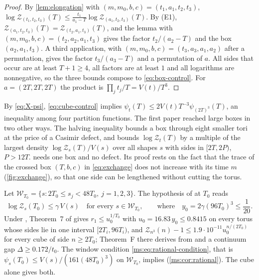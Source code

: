 \documentclass[11pt,a4paper]{amsart}
\theoremstyle{definition}
\theoremstyle{remark}
\numberwithin{equation}{section}
\newcommand{\Wwin}{\mathcal{W}}      %
\newcommand{\TT}{\mathbb{T}}               %
\newcommand{\Zc}{\mathcal{Z}}              %
\newcommand{\Zs}[2]{\Zc_{#1}(#2)}          %
\newcommand{\psiT}[2]{\psi_{#1}(#2)}       %
\newcommand{\Vol}[1]{V(#1)}                %
\newcommand{\cube}[1]{(2#1)^3}             %
\newcommand{\Bstar}{\text{\upshape(B$^{*}$)}}       %
\newcommand{\hypW}{\text{\upshape(W)}}              %
\newcommand{\tzero}{t_0}                   %
\begin{document}
\begin{proof}
By \cref{lem:elongation} with $(m,m_0,b,c)=(t_1,a_1,t_2,t_3)$, $\log\Zs{(t_1,t_2,t_3)}{T}\le\frac{t_1}{a_1-T}\log\Zs{(a_1,t_2,t_3)}{T}$. By (E1), $\Zs{(a_1,t_2,t_3)}{T}=\Zs{(t_2,a_1,t_3)}{T}$, and the lemma with $(m,m_0,b,c)=(t_2,a_2,a_1,t_3)$ gives the factor $t_2/(a_2-T)$ and the box $(a_2,a_1,t_3)$. A third application, with $(m,m_0,b,c)=(t_3,a_3,a_1,a_2)$ after a permutation, gives the factor $t_3/(a_3-T)$ and a permutation of $a$. All sides that occur are at least $T+1\ge4$, all factors are at least $1$ and all logarithms are nonnegative, so the three bounds compose to \eqref{eq:box-control}. For $a=(2T,2T,2T)$ the product is $\prod_jt_j/T=\Vol{t}/T^3$.
\end{proof}

By \eqref{eq:X-psi}, \eqref{eq:cube-control} implies $\psiT{t}{T}\le2\Vol{t}T^{-3}\psiT{\cube{T}}{T}$, an inequality among four partition functions. The first paper reached large boxes in two other ways. The halving inequality \cite[Proposition~13]{bhattacharjee2026first} bounds a box through eight smaller tori at the price of a Casimir defect, and \cite[Proposition~26]{bhattacharjee2026first} bounds $\log\Zs{t}{T}$ by a multiple of the largest density $\log\Zs{s}{T}/\Vol{s}$ over all shapes $s$ with sides in $[2T,2P)$, $P>12T$.  needs one box and no defect. Its proof rests on the fact that the trace of the crossed box $(T,b,c)$ in \eqref{eq:exchange} does not increase with its time $m$ (\cref{fig:exchange}), so that one side can be lengthened without cutting the torus.

Let $\Wwin_{T_0}=\{s:2T_0\le s_j<48T_0,\ j=1,2,3\}$. The hypothesis \Bstar{} of \cite[Theorem~7]{bhattacharjee2026first} at $T_0$ reads
\begin{equation}\label{eq:Bstar}
\log\Zs{s}{T_0}\le\gamma\,\Vol{s}\quad\text{for every }s\in\Wwin_{T_0},\qquad\text{where}\quad y_0=2\gamma(96T_0)^3\le\frac1{20}.
\end{equation}
Under \Bstar{}, Theorem~7 of \cite{bhattacharjee2026first} gives $r_1\le u_0^{1/T_0}$ with $u_0=16.83\,y_0\le0.8415$ on every torus whose sides lie in one interval $[2T_i,96T_i)$, and $\Zs{n^3}{n}-1\le1.9\cdot10^{-11}u_0^{n/(2T_0)}$ for every cube of side $n\ge2T_0$; Theorem~F there derives from \Bstar{} and \hypW{} a continuum gap $\Delta\ge0.172/\tzero$. The window condition \eqref{ms:eq:rational-condition}, that is $\psiT{s}{T_0}\le\Vol{s}/(161(48T_0)^3)$ on $\Wwin_{T_0}$, implies \Bstar{} (\cref{ms:cor:rational}). The cube alone gives both.
\end{document}
